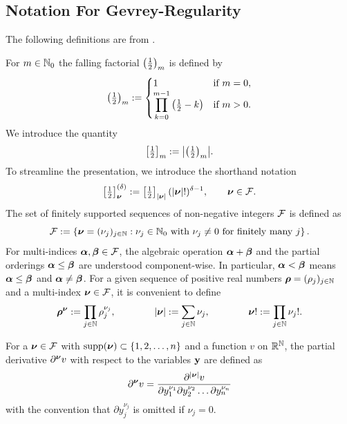\subsection{Notation For Gevrey-Regularity}
The following definitions are from  \cite{chernov2026gevreyclassregularitysteadystate}. 

For $m \in {\mathbb N}_0$ the falling factorial $\left(\tfrac{1}{2}\right)_m$ is defined by  
\begin{equation*}
	\left(\tfrac{1}{2}\right)_m
	:=
	\begin{cases}
		1 \quad & \text{if } m=0, \\
		\displaystyle \prod_{{k=0}}^{m-1} \left(\tfrac{1}{2} - k\right)& \text{if } m > 0. 
	\end{cases}	
\end{equation*}	
 We introduce the quantity
\begin{equation*}
	\left[\tfrac{1}{2} \right]_{m} := {\left|\left(\tfrac{1}{2}\right)_m\right|}.
\end{equation*}	
To streamline the presentation, we introduce the shorthand notation
	\begin{equation*}
		\left[\tfrac{1}{2} \right]^{(\delta)}_{{\boldsymbol{\nu}}} :=  \left[\tfrac{1}{2} \right]_{{\left|{\boldsymbol{\nu}}\right|}}  ({\left|{\boldsymbol{\nu}}\right|}!)^{\delta-1}, {\qquad {\boldsymbol{\nu}} \in {\mathcal F}.}
	\end{equation*}
The set of finitely supported sequences of non-negative integers ${\mathcal F}$ is defined as
\begin{equation}\label{cF-def}
	{\mathcal F} := 
	\left\{
	{\boldsymbol{\nu}} ={(\nu_j)_{j \in {\mathbb N}}} : \nu_j\in {\mathbb N}_0 \text{ with } \nu_j \neq 0 \text{ for  finitely many } j
	\right\}.
\end{equation}
For multi-indices ${\boldsymbol{\alpha}}, \boldsymbol{\beta} \in {\mathcal F}$, the algebraic operation ${\boldsymbol{\alpha}} + \boldsymbol{\beta}$ and the partial orderings ${\boldsymbol{\alpha}} \leq \boldsymbol{\beta}$ are understood component-wise. In particular, ${\boldsymbol{\alpha}} < \boldsymbol{\beta}$ means ${\boldsymbol{\alpha}} \leq \boldsymbol{\beta}$ and ${\boldsymbol{\alpha}} \neq \boldsymbol{\beta}$. For a given sequence of positive real numbers ${\boldsymbol{\rho}}=(\rho_j)_{j{\in {\mathbb N}}}$ and a multi-index ${\boldsymbol{\nu}} \in {\mathcal F}$, it is convenient to define
\begin{align*}
	{\boldsymbol{\rho}}^{{\boldsymbol{\nu}}} := \prod_{j{\in {\mathbb N}}} \rho_j^{\nu_j},
	\qquad \qquad
	{\left|{\boldsymbol{\nu}}\right|} := \sum_{j{\in {\mathbb N}}} \nu_j, 
	\qquad \qquad
	{\boldsymbol{\nu}}! := \prod_{j{\in {\mathbb N}}} \nu_j!. 
\end{align*}


For a ${\boldsymbol{\nu}}\in {\mathcal F}$ with  $\operatorname{supp} ({\boldsymbol{\nu}}) \subset\left\{1,2,\dots, n\right\}$ and a function $v$ on $\mathbb{R}^{\mathbb N}$, the partial derivative $\partial^{{\boldsymbol{\nu}}} v$ with respect to the variables ${\mathbf{y}}$ are defined as
\begin{align*}
	\partial^{{\boldsymbol{\nu}}} v
	=
	\frac{\partial^{{\left|{\boldsymbol{\nu}}\right|}}v}
	{\partial y_1^{\nu_1} \partial y_2^{\nu_2} \dots \partial y_n^{\nu_n}}
\end{align*}
with the convention that $\partial y_j^{\nu_j}$ is omitted if $\nu_j =0$. 


